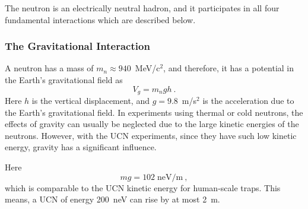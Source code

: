 
The neutron is an electrically neutral hadron, and it participates in
all four fundamental interactions which are described below.


\subsubsection{The Gravitational Interaction}
A neutron has a mass of $m_n\approx 940$~MeV/c$^2$, and therefore, it has a
potential in the Earth's gravitational field as
\begin{equation}
V_g=m_ngh~.
\end{equation}
Here $h$ is the vertical displacement, and $g=9.8$~m/s$^2$ is the
acceleration due to the Earth's gravitational field.  In experiments
using thermal or cold neutrons, the effects of gravity can usually be
neglected due to the large kinetic energies of the neutrons. However,
with the UCN experiments, since they have such low kinetic energy,
gravity has a significant influence.

Here
\begin{equation}
mg=102\; \text{neV/m}~,
\end{equation}
which is comparable to the UCN kinetic energy for human-scale
traps. This means, a UCN of energy 200~neV can rise by at most 2~m.

